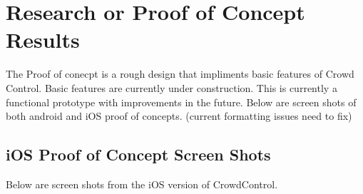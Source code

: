 \section{Research or Proof of Concept Results}


The Proof of conecpt is a rough design that impliments basic features of Crowd Control. Basic features are currently under construction. This is currently a functional prototype with improvements in the future.
\newline 
\newline
Below are screen shots of both android and iOS proof of concepts.
(current formatting issues need to fix)
\subsection{iOS Proof of Concept Screen Shots}

Below are screen shots from the iOS version of CrowdControl.


